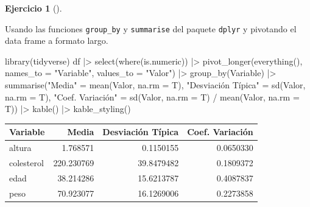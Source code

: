 \documentclass[
  a4paper,
]{scrreport}
\newenvironment{Shaded}{\begin{snugshade}}{\end{snugshade}}
\newcommand{\AttributeTok}[1]{\textcolor[rgb]{0.40,0.45,0.13}{#1}}
\newcommand{\FunctionTok}[1]{\textcolor[rgb]{0.28,0.35,0.67}{#1}}
\newcommand{\NormalTok}[1]{\textcolor[rgb]{0.00,0.23,0.31}{#1}}
\newcommand{\OtherTok}[1]{\textcolor[rgb]{0.00,0.23,0.31}{#1}}
\newcommand{\SpecialCharTok}[1]{\textcolor[rgb]{0.37,0.37,0.37}{#1}}
\newcommand{\StringTok}[1]{\textcolor[rgb]{0.13,0.47,0.30}{#1}}
\theoremstyle{definition}
\newtheorem{exercise}{Ejercicio}[chapter]
\theoremstyle{remark}
\begin{document}
\begin{exercise}[]
\begin{enumerate}
\begin{tcolorbox}
  \end{tcolorbox}

  \begin{tcolorbox}[enhanced jigsaw, coltitle=black, left=2mm, colback=white, leftrule=.75mm, toptitle=1mm, breakable, bottomrule=.15mm, titlerule=0mm, bottomtitle=1mm, title=\textcolor{quarto-callout-tip-color}{\faLightbulb}\hspace{0.5em}{Solución 3}, arc=.35mm, toprule=.15mm, rightrule=.15mm, colframe=quarto-callout-tip-color-frame, opacityback=0, colbacktitle=quarto-callout-tip-color!10!white, opacitybacktitle=0.6]

  Usando las funciones \texttt{group\_by} y \texttt{summarise} del
  paquete \texttt{dplyr} y pivotando el data frame a formato largo.

\begin{Shaded}
\begin{Highlighting}[]
\FunctionTok{library}\NormalTok{(tidyverse)}
\NormalTok{df }\SpecialCharTok{|\textgreater{}} \FunctionTok{select}\NormalTok{(}\FunctionTok{where}\NormalTok{(is.numeric)) }\SpecialCharTok{|\textgreater{}} 
    \FunctionTok{pivot\_longer}\NormalTok{(}\FunctionTok{everything}\NormalTok{(), }\AttributeTok{names\_to =} \StringTok{"Variable"}\NormalTok{, }\AttributeTok{values\_to =} \StringTok{"Valor"}\NormalTok{) }\SpecialCharTok{|\textgreater{}}
    \FunctionTok{group\_by}\NormalTok{(Variable) }\SpecialCharTok{|\textgreater{}}
    \FunctionTok{summarise}\NormalTok{(}\StringTok{"Media"} \OtherTok{=} \FunctionTok{mean}\NormalTok{(Valor, }\AttributeTok{na.rm =}\NormalTok{ T), }
    \StringTok{"Desviación Típica"} \OtherTok{=} \FunctionTok{sd}\NormalTok{(Valor, }\AttributeTok{na.rm =}\NormalTok{ T),}
    \StringTok{"Coef. Variación"} \OtherTok{=} \FunctionTok{sd}\NormalTok{(Valor, }\AttributeTok{na.rm =}\NormalTok{ T) }\SpecialCharTok{/} \FunctionTok{mean}\NormalTok{(Valor, }\AttributeTok{na.rm =}\NormalTok{ T)) }\SpecialCharTok{|\textgreater{}}
    \FunctionTok{kable}\NormalTok{() }\SpecialCharTok{|\textgreater{}}
    \FunctionTok{kable\_styling}\NormalTok{()}
\end{Highlighting}
\end{Shaded}

  \begin{table}
  \centering
  \begin{tabular}{l|r|r|r}
  \hline
  Variable & Media & Desviación Típica & Coef. Variación\\
  \hline
  altura & 1.768571 & 0.1150155 & 0.0650330\\
  \hline
  colesterol & 220.230769 & 39.8479482 & 0.1809372\\
  \hline
  edad & 38.214286 & 15.6213787 & 0.4087837\\
  \hline
  peso & 70.923077 & 16.1269006 & 0.2273858\\
  \hline
  \end{tabular}
  \end{table}


\end{tcolorbox}
\end{enumerate}
\end{exercise}
\end{document}
